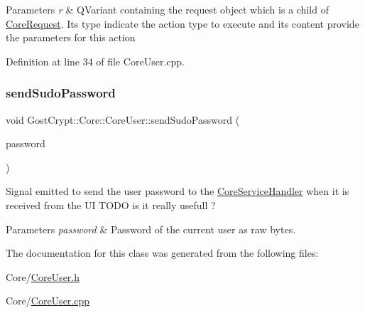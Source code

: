 \begin{DoxyParams}{Parameters}
{\em r} & Q\+Variant containing the request object which is a child of \hyperlink{struct_gost_crypt_1_1_core_1_1_core_request}{Core\+Request}. Its type indicate the action type to execute and its content provide the parameters for this action \\
\hline
\end{DoxyParams}


Definition at line 34 of file Core\+User.\+cpp.

\mbox{\label{class_gost_crypt_1_1_core_1_1_core_user_a3932d033fc64fc3e6a70f836e569f111}} 
\subsubsection{\texorpdfstring{send\+Sudo\+Password}{sendSudoPassword}}
{\footnotesize\ttfamily void Gost\+Crypt\+::\+Core\+::\+Core\+User\+::send\+Sudo\+Password (\begin{DoxyParamCaption}\item[{Q\+Shared\+Pointer$<$ Q\+Byte\+Array $>$}]{password }\end{DoxyParamCaption})\hspace{0.3cm}{\ttfamily [signal]}}



Signal emitted to send the user password to the \hyperlink{class_gost_crypt_1_1_core_1_1_core_service_handler}{Core\+Service\+Handler} when it is received from the UI T\+O\+DO is it really usefull ? 


\begin{DoxyParams}{Parameters}
{\em password} & Password of the current user as raw bytes. \\
\hline
\end{DoxyParams}


The documentation for this class was generated from the following files\+:\begin{DoxyCompactItemize}
\item 
Core/\hyperlink{_core_user_8h}{Core\+User.\+h}\item 
Core/\hyperlink{_core_user_8cpp}{Core\+User.\+cpp}\end{DoxyCompactItemize}
